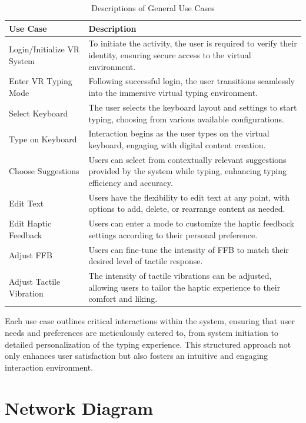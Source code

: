 \begin{table}[htbp]
\centering
\begin{tabular}{|p{4cm}|p{8cm}|}
\hline
\textbf{Use Case} & \textbf{Description} \\
\hline
Login/Initialize \ac{VR} System & To initiate the activity, the user is required to verify their identity, ensuring secure access to the virtual environment. \\
\hline
Enter \ac{VR} Typing Mode & Following successful login, the user transitions seamlessly into the immersive virtual typing environment. \\
\hline
Select Keyboard & The user selects the keyboard layout and settings to start typing, choosing from various available configurations. \\
\hline
Type on Keyboard & Interaction begins as the user types on the virtual keyboard, engaging with digital content creation. \\
\hline
Choose Suggestions & Users can select from contextually relevant suggestions provided by the system while typing, enhancing typing efficiency and accuracy. \\
\hline
Edit Text & Users have the flexibility to edit text at any point, with options to add, delete, or rearrange content as needed. \\
\hline
Edit Haptic Feedback & Users can enter a mode to customize the haptic feedback settings according to their personal preference. \\
\hline
Adjust \ac{FFB} & Users can fine-tune the intensity of \ac{FFB} to match their desired level of tactile response. \\
\hline
Adjust Tactile Vibration & The intensity of tactile vibrations can be adjusted, allowing users to tailor the haptic experience to their comfort and liking. \\
\hline
\end{tabular}
\caption{Descriptions of General Use Cases}
\label{tab:GeneralUseCases}
\end{table} 
\noindent Each use case outlines critical interactions within the system, ensuring that user needs and preferences are meticulously catered to, from system initiation to detailed personalization of the typing experience. This structured approach not only enhances user satisfaction but also fosters an intuitive and engaging interaction environment.
\clearpage
\section{Network Diagram}
\label{sec:NetworkDiagram}

